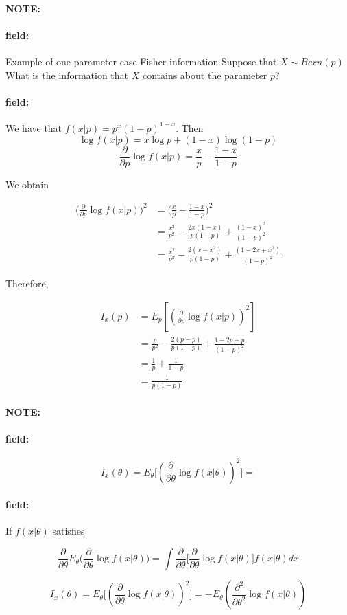 \documentclass[12pt]{article}
\newenvironment{note}{\paragraph{NOTE:}}{}
\newenvironment{field}{\paragraph{field:}}{}
\begin{document}
\begin{note}
  \begin{field}
    Example of one parameter case Fisher information
    Suppose that $X \sim Bern(p)$ What is the information that $X$ contains about the parameter $p$?
  \end{field}
  \begin{field}
    We have that $f(x|p) = p^x(1-p)^{1-x}$. Then $$ \log f(x|p) = x \log p + (1-x)\log(1-p)$$
    $$ \frac{\partial}{\partial p} \log f(x|p) = \frac{x}{p} - \frac{1-x}{1-p}$$

    We obtain


    \begin{align*}
      \big(\frac{\partial}{\partial p} \log f(x|p) \big)^2 &= \big(\frac{x}{p} - \frac{1-x}{1-p}\big)^2\\
      &= \frac{x^2}{p^2} - \frac{2x(1-x)}{p(1-p)} + \frac{(1-x)^2}{(1-p)^2}\\
      &= \frac{x^2}{p^2} - \frac{2(x-x^2)}{p(1-p)} + \frac{(1-2x+x^2)}{(1-p)^2}
    \end{align*}

    Therefore,

    \begin{align*}
      I_x(p) &= E_p[(\frac{\partial}{\partial p} \log f(x|p))^2]\\
      &= \frac{p}{p^2} - \frac{2(p-p)}{p(1-p)} + \frac{1 - 2p + p}{(1-p)^2}\\
      &= \frac{1}{p} + \frac{1}{1-p}\\
      &= \frac{1}{p(1-p)}
    \end{align*}
  \end{field}
\end{note}





\begin{note}
  \begin{field}
    $$ I_x(\theta) = E_\theta\big[(\frac{\partial}{\partial \theta} \log f(x|\theta))^2\big] = $$

  \end{field}
  \begin{field}
    If $f(x|\theta)$ satisfies

    $$ \frac{\partial}{\partial \theta} E_\theta \big( \frac{\partial}{\partial \theta} \log f(x|\theta)\big) = \int \frac{\partial}{\partial \theta}\big[\frac{\partial}{\partial \theta}\log f(x|\theta)\big]f(x|\theta)dx $$

    $$ I_x(\theta) = E_\theta\big[(\frac{\partial}{\partial \theta} \log f(x|\theta))^2\big] = - E_\theta (\frac{\partial^2}{\partial \theta^2} \log f(x|\theta))$$
  \end{field}
\end{note}
\end{document}
